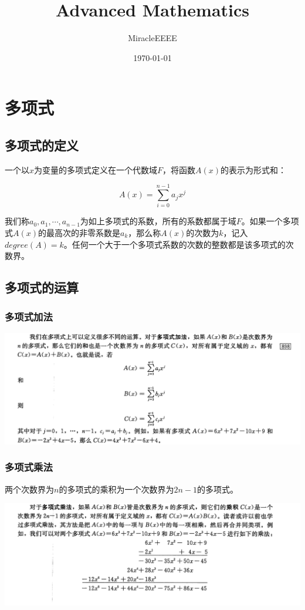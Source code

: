 \documentclass[11pt]{article}
\author{MiracleEEEE}
\date{\today}
\title{Advanced Mathematics}
\begin{document}
\maketitle
\tableofcontents


\section{多项式}
\label{sec-1}
\subsection{多项式的定义}
\label{sec-1-1}

一个以\(x\)为变量的多项式定义在一个代数域\(F\)，将函数\(A(x)\)的表示为形式和：

$$
A(x)=\sum_{i=0}^{n-1} a_jx^j
$$

我们称\(a_0,a_1,\cdots,a_{n-1}\)为如上多项式的系数，所有的系数都属于域\(F\)。如果一个多项式\(A(x)\)的最高次的非零系数是\(a_k\)，那么称\(A(x)\)的次数为\(k\)，记入\(degree(A)=k\)。任何一个大于一个多项式系数的次数的整数都是该多项式的次数界。

\subsection{多项式的运算}
\label{sec-1-2}
\subsubsection{多项式加法}
\label{sec-1-2-1}

\includegraphics[width=.9\linewidth]{./Source/Polynomial/1.png} 

\subsubsection{多项式乘法}
\label{sec-1-2-2}

两个次数界为\(n\)的多项式的乘积为一个次数界为\(2n-1\)的多项式。

\includegraphics[width=.9\linewidth]{./Source/Polynomial/2.png}
\end{document}
